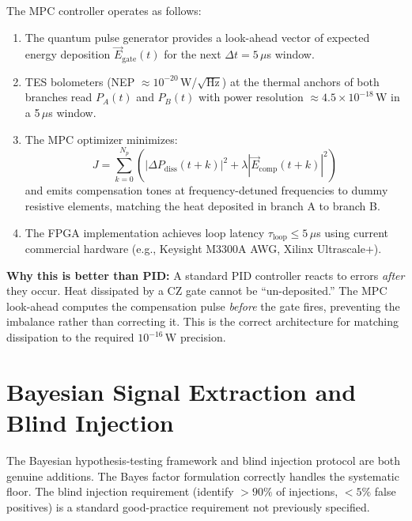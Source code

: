 \documentclass[11pt,letterpaper]{article}
\begin{document}
The MPC controller operates as follows:
\begin{enumerate}[noitemsep]
  \item The quantum pulse generator provides a look-ahead vector of expected energy
    deposition $\vec{E}_{\mathrm{gate}}(t)$ for the next $\Delta t = 5\,\mu$s window.
  \item TES bolometers (NEP $\approx 10^{-20}$\,W/$\sqrt{\mathrm{Hz}}$) at the thermal
    anchors of both branches read $P_A(t)$ and $P_B(t)$ with power resolution
    $\approx 4.5\times10^{-18}$\,W in a 5\,$\mu$s window.
  \item The MPC optimizer minimizes:
    \begin{equation}
      J = \sum_{k=0}^{N_p}\!\left(|\Delta P_{\mathrm{diss}}(t+k)|^2
          + \lambda|\vec{E}_{\mathrm{comp}}(t+k)|^2\right)
    \end{equation}
    and emits compensation tones at frequency-detuned frequencies to dummy resistive
    elements, matching the heat deposited in branch A to branch B.
  \item The FPGA implementation achieves loop latency $\tau_{\mathrm{loop}} \leq 5\,\mu$s
    using current commercial hardware (e.g., Keysight M3300A AWG, Xilinx Ultrascale+).
\end{enumerate}

\textbf{Why this is better than PID:}  A standard PID controller reacts to errors
\emph{after} they occur.  Heat dissipated by a CZ gate cannot be ``un-deposited.''
The MPC look-ahead computes the compensation pulse \emph{before} the gate fires,
preventing the imbalance rather than correcting it.  This is the correct architecture
for matching dissipation to the required $10^{-16}$\,W precision.

\section{Bayesian Signal Extraction and Blind Injection}
\label{sec:bayes}

\begin{auditpass}
The Bayesian hypothesis-testing framework and blind injection protocol are both
genuine additions.  The Bayes factor formulation correctly handles the systematic floor.
The blind injection requirement (identify $>90\%$ of injections, $<5\%$ false positives)
is a standard good-practice requirement not previously specified.
\end{auditpass}
\end{document}
